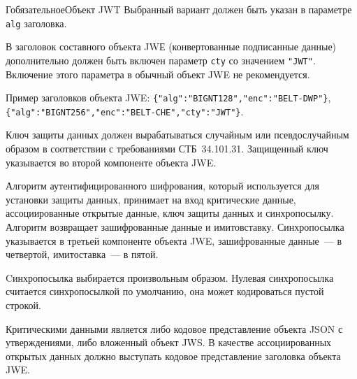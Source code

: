 \begin{appendix}{Г}{обязательное}{Объект JWT}
Выбранный вариант должен быть указан в параметре \lstinline{alg} заголовка. 

В заголовок составного объекта JWЕ (конвертованные подписанные данные) 
дополнительно должен быть включен параметр \lstinline{cty} со значением 
\lstinline{"JWT"}. 
%
Включение этого параметра в обычный объект JWE не рекомендуется.

Пример заголовков объекта JWE: 
\lstinline|{"alg":"BIGNT128","enc":"BELT-DWP"}|,
\lstinline|{"alg":"BIGNT256","enc":"BELT-CHE","cty":"JWT"}|.

Ключ защиты данных должен вырабатываться случайным или псевдослучайным образом 
в соответствии с требованиями СТБ~34.101.31.
%
Защищенный ключ указывается во второй компоненте объекта JWE.

Алгоритм аутентифицированного шифрования, который используется для установки 
защиты данных, принимает на вход критические данные, ассоциированные открытые 
данные, ключ защиты данных и синхропосылку. Алгоритм возвращает зашифрованные 
данные и имитовставку.
%
Синхропосылка указывается в третьей компоненте объекта JWE, зашифрованные 
данные~--- в четвертой, имитоставка~--- в пятой.

Cинхропосылка выбирается произвольным образом.
%
Нулевая синхропосылка считается синхропосылкой по умолчанию, она может 
кодироваться пустой строкой.

Критическими данными является либо кодовое представление объекта JSON с 
утверждениями, либо вложенный объект JWS. 
%
В качестве ассоциированных открытых данных должно выступать кодовое 
представление заголовка объекта JWE.

\end{appendix}
